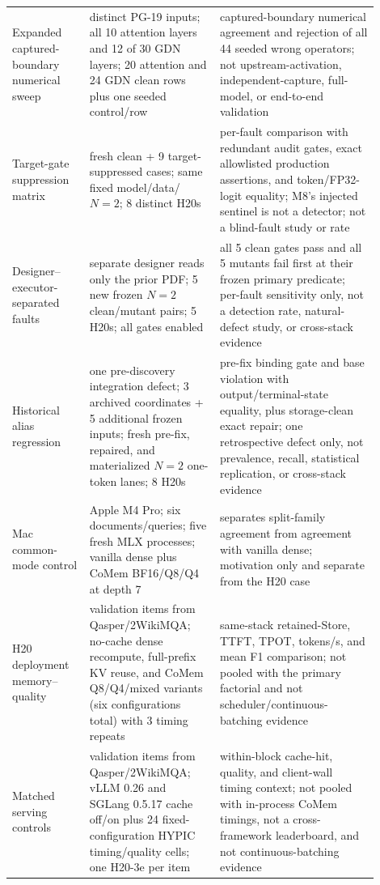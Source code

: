 \documentclass{article}
\begin{document}
\begin{longtable}{@{}>{\raggedright\arraybackslash}p{0.19\linewidth}>{\raggedright\arraybackslash}p{0.32\linewidth}>{\raggedright\arraybackslash}p{0.39\linewidth}@{}}
  Expanded captured-boundary numerical sweep & 2 distinct PG-19 inputs; all 10 attention layers and 12 of 30 GDN layers; 20 attention and 24 GDN clean rows plus one seeded control/row & captured-boundary numerical agreement and rejection of all 44 seeded wrong operators; not upstream-activation, independent-capture, full-model, or end-to-end validation \\
  Target-gate suppression matrix & 9 fresh clean + 9 target-suppressed cases; same fixed model/data/$N=2$; 8 distinct H20s & per-fault comparison with redundant audit gates, exact allowlisted production assertions, and token/FP32-logit equality; M8's injected sentinel is not a detector; not a blind-fault study or rate \\
  Designer--executor-separated faults & separate designer reads only the prior PDF; 5 new frozen $N=2$ clean/mutant pairs; 5 H20s; all gates enabled & all 5 clean gates pass and all 5 mutants fail first at their frozen primary predicate; per-fault sensitivity only, not a detection rate, natural-defect study, or cross-stack evidence \\
  Historical alias regression & one pre-discovery integration defect; 3 archived coordinates + 5 additional frozen inputs; fresh pre-fix, repaired, and materialized $N=2$ one-token lanes; 8 H20s & pre-fix binding gate and base violation with output/terminal-state equality, plus storage-clean exact repair; one retrospective defect only, not prevalence, recall, statistical replication, or cross-stack evidence \\
  Mac common-mode control & Apple M4 Pro; six documents/queries; five fresh MLX processes; vanilla dense plus CoMem BF16/Q8/Q4 at depth 7 & separates split-family agreement from agreement with vanilla dense; motivation only and separate from the H20 case \\
  H20 deployment memory--quality & 8 validation items from Qasper/2WikiMQA; no-cache dense recompute, full-prefix KV reuse, and CoMem Q8/Q4/mixed variants (six configurations total) with 3 timing repeats & same-stack retained-Store, TTFT, TPOT, tokens/s, and mean F1 comparison; not pooled with the primary factorial and not scheduler/continuous-batching evidence \\
  Matched serving controls & 8 validation items from Qasper/2WikiMQA; vLLM 0.26 and SGLang 0.5.17 cache off/on plus 24 fixed-configuration HYPIC timing/quality cells; one H20-3e per item & within-block cache-hit, quality, and client-wall timing context; not pooled with in-process CoMem timings, not a cross-framework leaderboard, and not continuous-batching evidence \\

\end{longtable}
\end{document}
